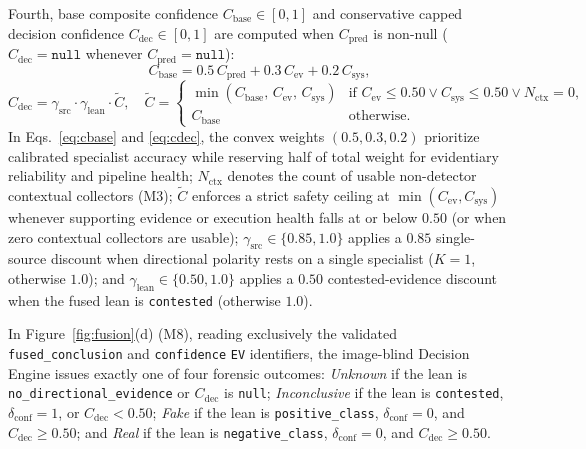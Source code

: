 \documentclass[final,5p,times,twocolumn,numafflabel]{elsarticle}
\begin{document}
Fourth, base composite confidence $C_{\text{base}} \in [0, 1]$ and conservative capped decision confidence $C_{\text{dec}} \in [0, 1]$ are computed when $C_{\text{pred}}$ is non-null ($C_{\text{dec}} = \texttt{null}$ whenever $C_{\text{pred}} = \texttt{null}$):
\begin{equation}
  C_{\text{base}} = 0.5\,C_{\text{pred}} + 0.3\,C_{\text{ev}} + 0.2\,C_{\text{sys}},
  \label{eq:cbase}
\end{equation}
\begin{equation}
  C_{\text{dec}} = \gamma_{\text{src}} \cdot \gamma_{\text{lean}} \cdot \tilde{C}, \quad
  \tilde{C} = \begin{cases}
    \min(C_{\text{base}},\, C_{\text{ev}},\, C_{\text{sys}}) & \text{if } C_{\text{ev}} \le 0.50 \lor C_{\text{sys}} \le 0.50 \lor N_{\text{ctx}} = 0, \\
    C_{\text{base}} & \text{otherwise}.
  \end{cases}
  \label{eq:cdec}
\end{equation}
In Eqs.~\eqref{eq:cbase} and \eqref{eq:cdec}, the convex weights $(0.5, 0.3, 0.2)$ prioritize calibrated specialist accuracy while reserving half of total weight for evidentiary reliability and pipeline health; $N_{\text{ctx}}$ denotes the count of usable non-detector contextual collectors (M3); $\tilde{C}$ enforces a strict safety ceiling at $\min(C_{\text{ev}}, C_{\text{sys}})$ whenever supporting evidence or execution health falls at or below $0.50$ (or when zero contextual collectors are usable); $\gamma_{\text{src}} \in \{0.85, 1.0\}$ applies a $0.85$ single-source discount when directional polarity rests on a single specialist ($K = 1$, otherwise $1.0$); and $\gamma_{\text{lean}} \in \{0.50, 1.0\}$ applies a $0.50$ contested-evidence discount when the fused lean is \texttt{contested} (otherwise $1.0$).

In Figure~\ref{fig:fusion}(d) (M8), reading exclusively the validated \texttt{fused\_conclusion} and \texttt{confidence} \texttt{EV} identifiers, the image-blind Decision Engine issues exactly one of four forensic outcomes: \textit{Unknown} if the lean is \texttt{no\_directional\_evidence} or $C_{\text{dec}}$ is \texttt{null}; \textit{Inconclusive} if the lean is \texttt{contested}, $\delta_{\text{conf}} = 1$, or $C_{\text{dec}} < 0.50$; \textit{Fake} if the lean is \texttt{positive\_class}, $\delta_{\text{conf}} = 0$, and $C_{\text{dec}} \ge 0.50$; and \textit{Real} if the lean is \texttt{negative\_class}, $\delta_{\text{conf}} = 0$, and $C_{\text{dec}} \ge 0.50$.
\end{document}
